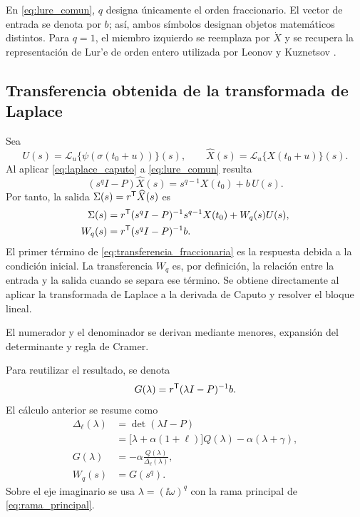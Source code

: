 En \cref{eq:lure_comun}, \(q\) designa únicamente el orden fraccionario. El
vector de entrada se denota por \(b\); así, ambos símbolos designan objetos
matemáticos distintos. Para \(q=1\), el miembro izquierdo se reemplaza por
\(\dot X\) y se recupera la representación de Lur'e de orden entero utilizada
por Leonov y Kuznetsov
\cite{LeonovKuznetsov2013,KuznetsovEtAl2017}.

\subsection{Transferencia obtenida de la transformada de Laplace}

Sea
\[
U(s)=\mathcal L_u\{\psi(\sigma(t_0+u))\}(s),\qquad
\widehat X(s)=\mathcal L_u\{X(t_0+u)\}(s).
\]
Al aplicar \cref{eq:laplace_caputo} a \cref{eq:lure_comun} resulta
\begin{equation}
(s^qI-P)\widehat X(s)
=s^{q-1}X(t_0)+b\,U(s).
\label{eq:lure_laplace}
\end{equation}
Por tanto, la salida \(\Sigma(s)=r^{\mathsf T}\widehat X(s)\) es
\begin{equation}
\begin{aligned}
\Sigma(s)
&=r^{\mathsf T}(s^qI-P)^{-1}s^{q-1}X(t_0)
  +W_q(s)U(s),\\
W_q(s)&=r^{\mathsf T}(s^qI-P)^{-1}b.
\end{aligned}
\label{eq:transferencia_fraccionaria}
\end{equation}
El primer término de \cref{eq:transferencia_fraccionaria} es la respuesta
debida a la condición inicial. La transferencia \(W_q\) es, por definición, la
relación entre la entrada y la salida cuando se separa ese término. Se obtiene
directamente al aplicar la transformada de Laplace a la derivada de Caputo y
resolver el bloque lineal.

El numerador y el denominador se derivan mediante menores, expansión del
determinante y regla de Cramer.
\begingroup
\def\HAFOderivationpart{2}

\endgroup
Para reutilizar el resultado, se denota
\[
G(\lambda)=r^{\mathsf T}(\lambda I-P)^{-1}b.
\]
El cálculo anterior se resume como
\begin{equation}
\begin{aligned}
\Delta_\ell(\lambda)
&=\det(\lambda I-P)\\
&=\bigl[\lambda+\alpha(1+\ell)\bigr]Q(\lambda)
  -\alpha(\lambda+\gamma),\\
G(\lambda)&=-\alpha\frac{Q(\lambda)}{\Delta_\ell(\lambda)},\\
W_q(s)&=G(s^q).
\end{aligned}
\label{eq:transferencia_explicita}
\end{equation}
Sobre el eje imaginario se usa
\(\lambda=(\ii\omega)^q\) con la rama principal de
\cref{eq:rama_principal}.

